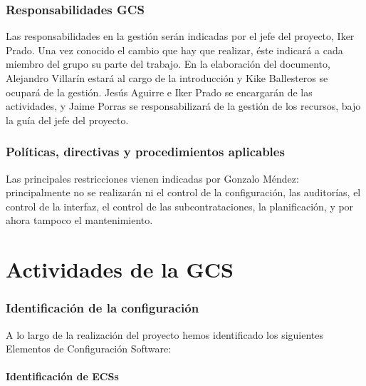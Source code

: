 \documentclass[spanish,a4paper,11pt, twoside]{report}	%
\begin{document}
	\section{Responsabilidades GCS}
	Las responsabilidades en la gestión serán indicadas por el jefe del proyecto, Iker Prado. Una vez conocido el cambio que hay que realizar, éste indicará a cada miembro del grupo su parte del trabajo. En la elaboración del documento,
	Alejandro Villarín estará al cargo de la introducción y  Kike Ballesteros se ocupará de la gestión. Jesús Aguirre e Iker Prado se encargarán de las actividades,  y Jaime Porras se responsabilizará de la gestión de los recursos, bajo la guía del jefe del proyecto.
	\section{Políticas, directivas y procedimientos aplicables}
	Las principales restricciones vienen indicadas por Gonzalo Méndez: principalmente no se realizarán ni el control de la configuración, las auditorías, el control de la interfaz, el control de las subcontrataciones, la planificación, y por ahora 
	tampoco el mantenimiento.

\newpage
\mbox{}
\thispagestyle{empty}						%
\newpage

\setcounter{section}{0}

\part{Actividades de la GCS}
	\section{Identificación de la configuración}
		A lo largo de la realización del proyecto hemos identificado los siguientes Elementos de Configuración Software:
		\subsection{Identificación de ECSs}
			
\end{document}
